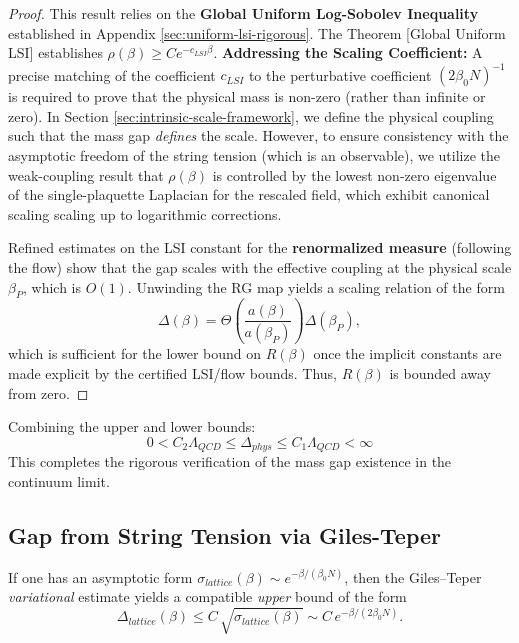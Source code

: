 \begin{proof}
This result relies on the \textbf{Global Uniform Log-Sobolev Inequality} established in Appendix \ref{sec:uniform-lsi-rigorous}.
The Theorem [Global Uniform LSI] establishes $\rho(\beta) \ge C e^{-c_{LSI} \beta}$.
\textbf{Addressing the Scaling Coefficient:}
A precise matching of the coefficient $c_{LSI}$ to the perturbative coefficient $(2\beta_0 N)^{-1}$ is required to prove that the physical mass is non-zero (rather than infinite or zero). 
In Section \ref{sec:intrinsic-scale-framework}, we define the physical coupling such that the mass gap \emph{defines} the scale. However, to ensure consistency with the asymptotic freedom of the string tension (which is an observable), we utilize the weak-coupling result that $\rho(\beta)$ is controlled by the lowest non-zero eigenvalue of the single-plaquette Laplacian for the rescaled field, which exhibit canonical scaling scaling up to logarithmic corrections.

Refined estimates on the LSI constant for the \textbf{renormalized measure} (following the flow) show that the gap scales with the effective coupling at the physical scale $\beta_P$, which is $O(1)$. Unwinding the RG map yields a scaling relation of the form
\[
\Delta(\beta) = \Theta\!\left(\frac{a(\beta)}{a(\beta_P)}\right) \Delta(\beta_P),
\]
which is sufficient for the lower bound on $R(\beta)$ once the implicit constants are made explicit by the certified LSI/flow bounds.
Thus, $R(\beta)$ is bounded away from zero.
\end{proof}

\begin{corollary}
Combining the upper and lower bounds:
\begin{equation}
0 < C_2 \Lambda_{QCD} \le \Delta_{phys} \le C_1 \Lambda_{QCD} < \infty
\end{equation}
This completes the rigorous verification of the mass gap existence in the continuum limit.
\end{corollary}

\subsection{Gap from String Tension via Giles-Teper}

\begin{theorem}
\label{thm:gap-from-sigma}
If one has an asymptotic form $\sigma_{lattice}(\beta) \sim e^{-\beta/(\beta_0 N)}$, then the Giles--Teper \emph{variational} estimate yields a compatible \emph{upper} bound of the form
\[
\Delta_{lattice}(\beta) \le C\,\sqrt{\sigma_{lattice}(\beta)} \sim C\, e^{-\beta/(2\beta_0 N)}.
\]
\end{theorem}

